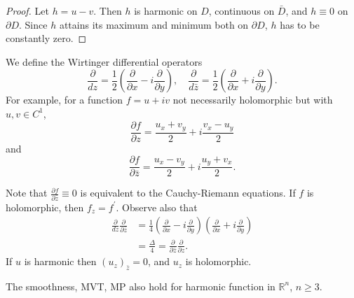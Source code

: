 \begin{proof}
Let $h = u - v$. Then $h$ is harmonic on $D$, continuous on
$\bar{D}$, and $h \equiv 0$ on $\partial D$. Since $h$
attains its maximum and minimum both on $\partial D$,
$h$ has to be constantly zero.
\end{proof}

\begin{defn}
We define the Wirtinger differential operators
$$
  \frac{\partial}{dz}
= \frac{1}{2}
  \left(
      \frac{\partial}{\partial x}
  - i \frac{\partial}{\partial y}
  \right), \quad
  \frac{\partial}{d\bar{z}}
= \frac{1}{2}
  \left(
      \frac{\partial}{\partial x}
  + i \frac{\partial}{\partial y}
  \right).
$$
For example, for a function $f = u + iv$
not necessarily holomorphic but with $u, v \in C^1$,
$$
  \frac{\partial f}{\partial z}
= \frac{u_x + v_y}{2} + i \frac{v_x - u_y}{2}
$$
and
$$
  \frac{\partial f}{\partial \bar{z}}
= \frac{u_x - v_y}{2} + i \frac{u_y + v_x}{2}.
$$

Note that
$\frac{\partial f}{\partial \bar{z}} \equiv 0$ is equivalent
to the Cauchy-Riemann equations. If $f$ is holomorphic, then
$f_z = f^\prime$. Observe also that
\begin{align*}
   \frac{\partial}{dz} \frac{\partial}{\partial \bar{z}}
&= \frac{1}{4}
   \left(
     \frac{\partial}{\partial x} - i \frac{\partial}{\partial y}
   \right)
   \left(
     \frac{\partial}{\partial x} + i \frac{\partial}{\partial y}
   \right) \\
&= \frac{\Delta}{4}
 = \frac{\partial}{\partial \bar{z}} \frac{\partial}{\partial z}.
\end{align*}
If $u$ is harmonic then $(u_z)_{\bar{z}} = 0$, and
$u_z$ is holomorphic.
\end{defn}

\begin{remark}
The smoothness, MVT, MP also hold for harmonic function in
$\mathbb{R}^n$, $n \geq 3$.
\end{remark}

